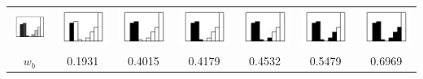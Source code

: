 \documentclass[a4paper,11pt]{article}
\begin{document}
\begin{center}
\begin{tabular}[p]{@{}ccccccc@{}}
  \includegraphics[scale=0.4]{assets/binarization/3bit_hist.png}
  &
  \includegraphics[scale=0.4]{assets/binarization/13hist.png}
  &
  \includegraphics[scale=0.4]{assets/binarization/25hist.png}
  &
  \includegraphics[scale=0.4]{assets/binarization/50hist.png}
  &
  \includegraphics[scale=0.4]{assets/binarization/63hist.png}
  &
  \includegraphics[scale=0.4]{assets/binarization/75hist.png}
  &
  \includegraphics[scale=0.4]{assets/binarization/88hist.png}

  \\
  $w_b$ & 0.1931 & 0.4015 & 0.4179 & 0.4532 & 0.5479 & 0.6969 \\


\end{tabular}
\end{center}
\end{document}
